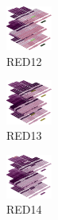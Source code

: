 \hspace{0.1cm}
\begin{minipage}[b]{0.15\linewidth}
\begin{figure}[H]                                                          
  \centering                                                             
  \begin{adjustbox}{width=1.5cm,center}                                   
  \includegraphics[width=1.5cm]{src/colorspace_colourflow/flows/colourflow_76-45.png}%
  \end{adjustbox}                                                        
\caption*{RED12}                                           
\end{figure}                                                               
\end{minipage}
\hspace{0.1cm}
\begin{minipage}[b]{0.15\linewidth}
\begin{figure}[H]                                                          
  \centering                                                             
  \begin{adjustbox}{width=1.5cm,center}                                   
  \includegraphics[width=1.5cm]{src/colorspace_colourflow/flows/colourflow_77-45.png}%
  \end{adjustbox}                                                        
\caption*{RED13}                                           
\end{figure}                                                               
\end{minipage}
\hspace{0.1cm}
\begin{minipage}[b]{0.15\linewidth}
\begin{figure}[H]                                                          
  \centering                                                             
  \begin{adjustbox}{width=1.5cm,center}                                   
  \includegraphics[width=1.5cm]{src/colorspace_colourflow/flows/colourflow_78-45.png}%
  \end{adjustbox}                                                        
\caption*{RED14}                                           
\end{figure}                                                               
\end{minipage}
